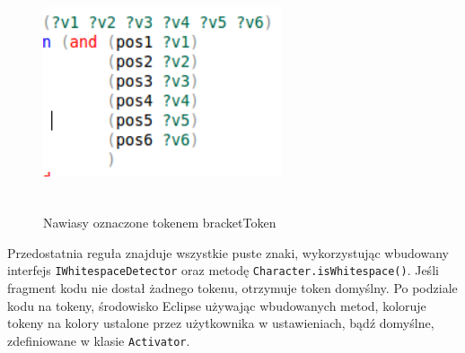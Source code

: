 \begin{figure}[h]
  \centering
    \includegraphics[width=7cm,height=7cm,keepaspectratio]{img/bracket-color.png}
    \caption{Nawiasy oznaczone tokenem bracketToken}
    \label{bracket_color}
\end{figure}

Przedostatnia reguła znajduje wszystkie puste znaki, wykorzystując wbudowany interfejs \texttt{IWhitespaceDetector} oraz metodę \texttt{Character.isWhitespace()}. Jeśli fragment kodu nie dostał żadnego tokenu, otrzymuje token domyślny.  Po podziale kodu na tokeny, środowisko Eclipse używając wbudowanych metod, koloruje tokeny na kolory ustalone przez użytkownika w ustawieniach, bądź domyślne, zdefiniowane w klasie \texttt{Activator}.
